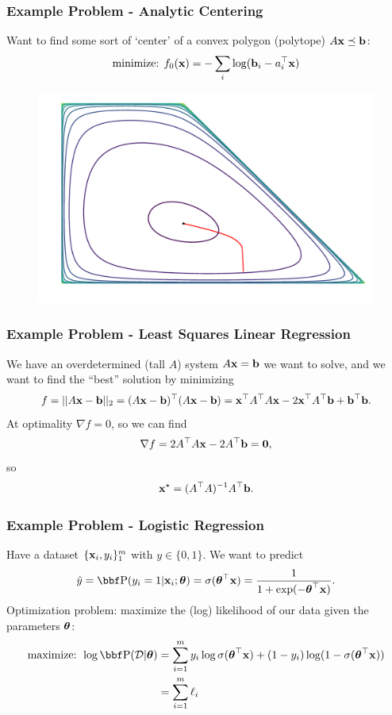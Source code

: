 \documentclass{beamer}
\begin{document}
\begin{frame}
    \frametitle{Example Problem - Analytic Centering}
    Want to find some sort of `center' of a convex polygon (polytope) $A{\bf x} \preceq {\bf b}$:
    \begin{align*}
        \text{minimize: } f_0({\bf x}) = -\sum_{i}\log({\bf b}_i - a_i^\top{\bf x})
    \end{align*}

    \begin{figure}
        \centering
        \includegraphics[width=0.7\linewidth]{../fig/analytic_centering.pdf}
    \end{figure}
\end{frame}

\begin{frame}
    \frametitle{Example Problem - Least Squares Linear Regression}
    We have an overdetermined (tall $A$) system $A{\bf x} = {\bf b}$ we want to solve,
    and we want to find the ``best'' solution by minimizing
    \[
        f = ||A{\bf x} - {\bf b}||_2 = (A{\bf x}-{\bf b})^\top(A{\bf x}-{\bf b}) = {\bf x}^\top A^\top A{\bf x} - 2{\bf x}^\top A^\top{\bf b} + {\bf b}^\top{\bf b}.
    \]
    At optimality $\nabla f = 0$, so we can find
    \[
        \nabla f = 2A^\top A{\bf x} - 2A^\top{\bf b} = {\bf 0},
    \]
    so
    \[
        {\bf x}^\star = (A^\top A)^{-1} A^\top{\bf b}.
    \]
\end{frame}

\begin{frame}
    \frametitle{Example Problem - Logistic Regression}
    Have a dataset $\{{\bf x}_i, y_i\}_1^m$ with $y\in \{0,1\}$. We want to predict
    \[
        \hat y = \PP(y_i = 1 | \xx_i ; \thetab) = \sigma(\thetab^\T\xx) = \frac{1}{1 + \exp(-\thetab^\T\xx)}.
    \]
    Optimization problem: maximize the (log) likelihood of our data given the parameters
    $\hbox{\boldmath$\theta$}$:
    \begin{align*}
        \text{maximize: } \log \PP(\Dc | \thetab) &= \sum_{i=1}^m y_i\log\sigma(\thetab^\T\xx) + (1-y_i)\log(1-\sigma(\thetab^\T\xx))\\
        &= \sum_{i=1}^m \ell_i
    \end{align*}
\end{frame}
\end{document}
